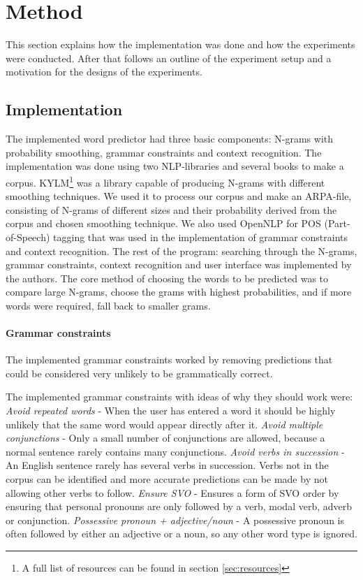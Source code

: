\section{Method}
This section explains how the implementation was done and how the experiments were conducted. After that follows an outline of the experiment setup and a motivation for the designs of the experiments.
\subsection{Implementation}
The implemented word predictor had three basic components: N-grams with probability smoothing, grammar constraints and context recognition. The implementation was done using two NLP-libraries and several books to make a corpus. KYLM\footnote{A full list of resources can be found in section \ref{sec:resources}} was a library capable of producing N-grams with different smoothing techniques. We used it to process our corpus and make an ARPA-file, consisting of N-grams of different sizes and their probability derived from the corpus and chosen smoothing technique. We also used OpenNLP for POS (Part-of-Speech) tagging that was used in the implementation of grammar constraints and context recognition. The rest of the program: searching through the N-grams, grammar constraints, context recognition and user interface was implemented by the authors. The core method of choosing the words to be predicted was to compare large N-grams, choose the grams with highest probabilities, and if more words were required, fall back to smaller grams.

\paragraph{Grammar constraints}
The implemented grammar constraints worked by removing predictions that could be considered very unlikely to be grammatically correct.

The implemented grammar constraints with ideas of why they should work were:
\emph{Avoid repeated words} - When the user has entered a word it should be highly unlikely that the same word would appear directly after it.
\emph{Avoid multiple conjunctions} - Only a small number of conjunctions are allowed, because a normal sentence rarely contains many conjunctions.
\emph{Avoid verbs in succession} - An English sentence rarely has several verbs in succession. Verbs not in the corpus can be identified and more accurate predictions can be made by not allowing other verbs to follow.
\emph{Ensure SVO} - Ensures a form of SVO order by ensuring that personal pronouns are only followed by a verb, modal verb, adverb or conjunction.
\emph{Possessive pronoun + adjective/noun} - A possessive pronoun is often followed by either an adjective or a noun, so any other word type is ignored.

